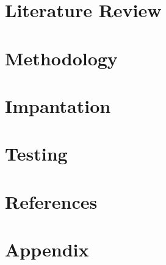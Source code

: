 \documentclass{article}
\begin{document}
\newpage

\section*{Literature Review}
\lipsum[1-2]
\newpage


\section*{Methodology}
\lipsum[1-2]
\newpage


\section*{Impantation}
\lipsum[1-2]
\newpage


\section*{Testing}
\lipsum[1-2]
\newpage


\section*{References}
\lipsum[1-2]
\newpage


\section{Appendix}
\lipsum[1-2]
\newpage
\end{document}
